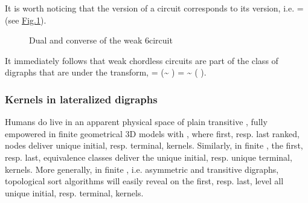 \documentclass[a4paper,12pt,english]{sphinxhowto}
\let\sphinxpxdimen\pdfpxdimen\else\newdimen\sphinxpxdimen
\begin{document}
\sphinxAtStartPar
It is worth noticing that the  version of a  circuit corresponds to its  version, i.e.  =  (see \hyperref[\detokenize{pearls:weakchordlesscircuit}]{Fig.\@ \ref{\detokenize{pearls:weakchordlesscircuit}}}).

\begin{sphinxVerbatim}[commandchars=\\\{\},numbers=left,firstnumber=1,stepnumber=1]
\end{sphinxVerbatim}

\begin{figure}[H]
\centering
\capstart

\noindent\sphinxincludegraphics[width=550\sphinxpxdimen]{{weakChordlessCircuit}.png}
\caption{Dual and converse of the weak 6\sphinxhyphen{}circuit}\label{\detokenize{pearls:weakchordlesscircuit}}\end{figure}

\sphinxAtStartPar
It immediately follows that weak chordless circuits are part of the class of digraphs that are  under the  transform,  = \sphinxhyphen{} (\textasciitilde{}  ) = \textasciitilde{} ( \sphinxhyphen{} ).


\subsubsection{Kernels in lateralized digraphs}
\label{\detokenize{pearls:kernels-in-lateralized-digraphs}}
\sphinxAtStartPar
Humans do live in an apparent physical space of plain transitive , fully empowered in finite geometrical 3D models with , where first, resp. last ranked, nodes deliver unique initial, resp. terminal, kernels. Similarly, in finite , the first, resp. last, equivalence classes deliver the unique initial, resp. unique terminal, kernels. More generally, in finite , i.e. asymmetric and transitive digraphs, topological sort algorithms will easily reveal on the first, resp. last, level all unique initial, resp. terminal, kernels.
\end{document}
